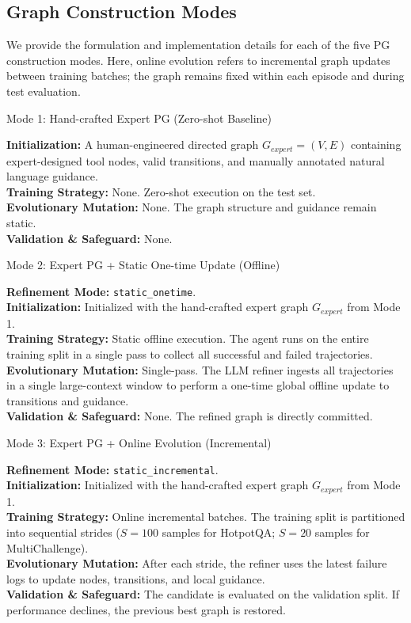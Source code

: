 \subsection{Graph Construction Modes}
\label{app:mode_details}
We provide the formulation and implementation details for each of the five PG construction modes. Here, online evolution refers to incremental graph updates between training batches; the graph remains fixed within each episode and during test evaluation.
\begin{modebox}{Mode 1: Hand-crafted Expert PG (Zero-shot Baseline)}
\footnotesize\raggedright
\textbf{Initialization:} A human-engineered directed graph $G_{expert} = (V, E)$ containing expert-designed tool nodes, valid transitions, and manually annotated natural language guidance. \\
\textbf{Training Strategy:} None. Zero-shot execution on the test set. \\
\textbf{Evolutionary Mutation:} None. The graph structure and guidance remain static. \\
\textbf{Validation \& Safeguard:} None.
\end{modebox}
\begin{modebox}{Mode 2: Expert PG + Static One-time Update (Offline)}
\footnotesize\raggedright
\textbf{Refinement Mode:} \texttt{static\_onetime}. \\
\textbf{Initialization:} Initialized with the hand-crafted expert graph $G_{expert}$ from Mode 1. \\
\textbf{Training Strategy:} Static offline execution. The agent runs on the entire training split in a single pass to collect all successful and failed trajectories. \\
\textbf{Evolutionary Mutation:} Single-pass. The LLM refiner ingests all trajectories in a single large-context window to perform a one-time global offline update to transitions and guidance. \\
\textbf{Validation \& Safeguard:} None. The refined graph is directly committed.
\end{modebox}
\begin{modebox}{Mode 3: Expert PG + Online Evolution (Incremental)}
\footnotesize\raggedright
\textbf{Refinement Mode:} \texttt{static\_incremental}. \\
\textbf{Initialization:} Initialized with the hand-crafted expert graph $G_{expert}$ from Mode 1. \\
\textbf{Training Strategy:} Online incremental batches. The training split is partitioned into sequential strides ($S=100$ samples for HotpotQA; $S=20$ samples for MultiChallenge). \\
\textbf{Evolutionary Mutation:} After each stride, the refiner uses the latest failure logs to update nodes, transitions, and local guidance. \\
\textbf{Validation \& Safeguard:} The candidate is evaluated on the validation split. If performance declines, the previous best graph is restored.
\end{modebox}
